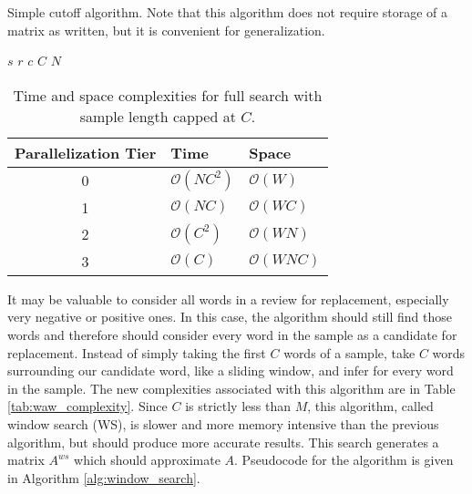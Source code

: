 \begin{algorithm}
\begin{algorithmic}[1]
\begin{spacing}{1.0}
    \caption{Simple cutoff algorithm.  Note that this algorithm does not require storage of a matrix as written, but it is convenient for generalization.}
    \Require $s$ 
    \Require $r$ 
    \Require $c$ 
    \Require $C$ 
    \Require $N$ 
            \EndIf
            \EndIf
        \EndFor
    \EndFor\\
\label{alg:cutoff}
\end{spacing}
\end{algorithmic}
\end{algorithm}

\begin{table}
\centering
\begin{tabular}{ |c|l|l| } 
 \hline
 Parallelization Tier & Time & Space \\ \hline
 0&$\mathcal{O}(NC^2)$ & $\mathcal{O}(W)$ \\ %
 1&$\mathcal{O}(NC)$ & $\mathcal{O}(WC)$ \\ %
 2&$\mathcal{O}(C^2)$ & $\mathcal{O}(WN)$ \\%
 3&$\mathcal{O}(C)$ & $\mathcal{O}(WNC)$ \\ \hline
\end{tabular}
\caption{Time and space complexities for full search with sample length capped at $C$.}
\label{tab:wa_complexity}
\end{table}

It may be valuable to consider all words in a review for replacement, especially very negative or positive ones.  In this case, the algorithm should still find those words and therefore should consider every word in the sample as a candidate for replacement.  Instead of simply taking the first $C$ words of a sample, take $C$ words surrounding our candidate word, like a sliding window, and infer for every word in the sample.  The new complexities associated with this algorithm are in Table \ref{tab:waw_complexity}.  Since $C$ is strictly less than $M$, this algorithm, called window search (WS), is slower and more memory intensive than the previous algorithm, but should produce more accurate results.  This search generates a matrix $A^{ws}$ which should approximate $A$.  Pseudocode for the algorithm is given in Algorithm \ref{alg:window_search}.

